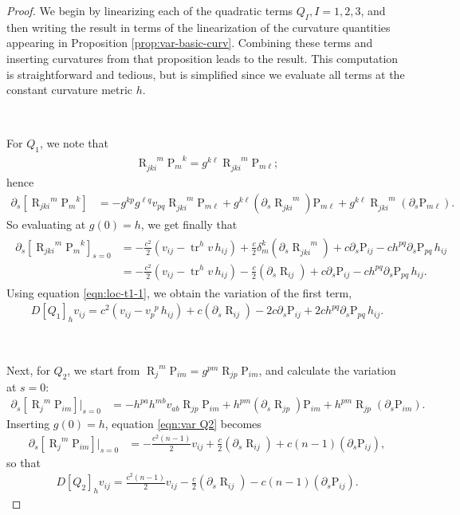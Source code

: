 \documentclass[10pt,reqno]{amsart}
\DeclareMathOperator{\tr}{tr}
\DeclareMathOperator{\Rc}{R}
\renewcommand{\P}{\mathrm{P}}
\DeclareMathOperator{\R}{R}
\newcommand{\riem}{\R}
\newcommand{\riemdddu}[4]{\riem^{\phantom{#1 #2 #3} #4}_{#1 #2 #3}}
\newcommand{\vdu}[2]{v_{#1}^{\phantom{#1} #2}}
\begin{document}
\begin{proof}
We begin by linearizing each of the quadratic terms $Q_I, I = 1,2,3$, and then writing the result in terms of the linearization of the curvature quantities appearing in Proposition
\ref{prop:var-basic-curv}. Combining these terms and inserting curvatures from that proposition leads to the result. This computation is straightforward and tedious, 
but is simplified since we evaluate all terms at the constant curvature metric $h$. 
	
	\
	
For $Q_1$, we note that
\begin{align*}
\riemdddu{j}{k}{i}{m} {\P_{m}}^k = g^{k \ell} \riemdddu{j}{k}{i}{m} \P_{m\ell};
\end{align*}
hence
\begin{align*}
\partial_s [ {\R_{jki}}^m {\P_{m}}^k ] &= -g^{k p} g^{\ell q} v_{p q} \riemdddu{j}{k}{i}{m} \P_{m\ell} + g^{k \ell} (\partial_s \riemdddu{j}{k}{i}{m}) \P_{m\ell} + g^{k \ell} 
\riemdddu{j}{k}{i}{m} (\partial_s \P_{m\ell}).
\end{align*}
So evaluating at $g(0) = h$, we get finally that
\begin{align} \label{eqn:loc-t1-1}
\begin{aligned}
\partial_s [ {\R_{jki}}^m {\P_{m}}^k ]_{s=0} &= -\frac{c^2}{2} ( v_{ij} - \tr^h v \, h_{ij} ) + \frac{c}{2} \delta^k_m (\partial_s \riemdddu{j}{k}{i}{m}) + c  \partial_s \P_{ij} - 
c h^{pq} \partial_s \P_{pq} \, h_{ij} \\ 
&= -\frac{c^2}{2} ( v_{ij} - \tr^h v \, h_{ij} ) - \frac{c}{2}  (\partial_s \Rc_{ij}) + c  \partial_s \P_{ij} - c h^{pq} \partial_s \P_{pq} \, h_{ij}.
\end{aligned}
\end{align}
Using equation \eqref{eqn:loc-t1-1}, we obtain the variation of the first term,
\begin{align} \label{eqn:loc-DQ1}
D[Q_1]_h v_{ij} = c^2 ( v_{ij} - \vdu{p}{p} \, h_{ij} ) + c  (\partial_s \Rc_{ij}) - 2c \partial_s \P_{ij} + 2c h^{pq} \partial_s \P_{pq} \, h_{ij}.
\end{align}

\
	
Next, for $Q_2$, we start from ${\Rc_{j}}^m \P_{im} = g^{pm} \Rc_{jp} \P_{im}$, and calculate the variation at $s=0$:
\begin{align}
\label{eqn:var Q2}
\partial_s [{\Rc_{j}}^m \P_{im}]|_{s=0} &= -h^{pa} h^{mb} v_{ab} \Rc_{jp} \P_{im} + h^{pm} (\partial_s \Rc_{jp}) \P_{im} + h^{pm} \Rc_{jp} (\partial_s \P_{im}).
\end{align}
Inserting $g(0) = h$, equation \eqref{eqn:var Q2} becomes
\begin{align*}
\partial_s [{\Rc_{j}}^m \P_{im}]|_{s=0} 
&= - \frac{c^2(n-1)}{2} v_{ij} + \frac{c}{2} (\partial_s \Rc_{ij}) +  c(n-1) (\partial_s \P_{ij}),
\end{align*}
so that
\begin{align}\label{eqn:loc-DQ2}
D[Q_2]_h v_{ij} = \frac{c^2(n-1)}{2} v_{ij} - \frac{c}{2} (\partial_s \Rc_{ij}) -  c(n-1) (\partial_s \P_{ij}).
\end{align}


\end{proof}
\end{document}
